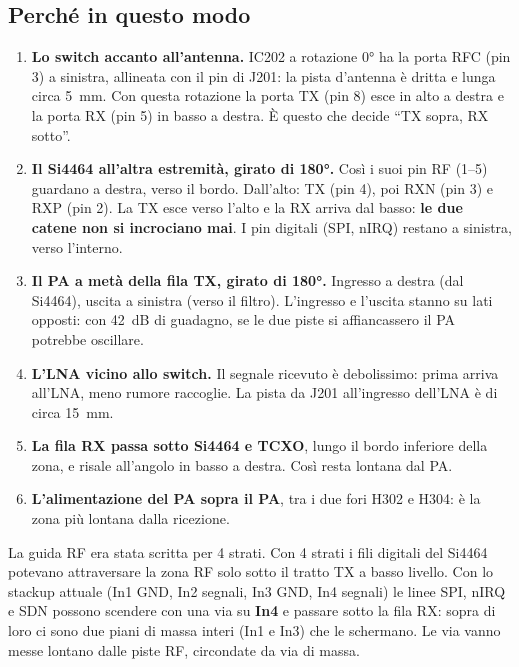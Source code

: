 \documentclass[a4paper,11pt]{article}
\begin{document}
\subsection{Perché in questo modo}
\begin{enumerate}
\item \textbf{Lo switch accanto all'antenna.} IC202 a rotazione \ang{0} ha la porta RFC (pin 3) a sinistra, allineata con il pin di J201: la pista d'antenna è dritta e lunga circa \SI{5}{mm}. Con questa rotazione la porta TX (pin 8) esce in alto a destra e la porta RX (pin 5) in basso a destra. È questo che decide \enquote{TX sopra, RX sotto}.
\item \textbf{Il Si4464 all'altra estremità, girato di \ang{180}.} Così i suoi pin RF (1--5) guardano a destra, verso il bordo. Dall'alto: TX (pin 4), poi RXN (pin 3) e RXP (pin 2). La TX esce verso l'alto e la RX arriva dal basso: \textbf{le due catene non si incrociano mai}. I pin digitali (SPI, nIRQ) restano a sinistra, verso l'interno.
\item \textbf{Il PA a metà della fila TX, girato di \ang{180}.} Ingresso a destra (dal Si4464), uscita a sinistra (verso il filtro). L'ingresso e l'uscita stanno su lati opposti: con \SI{42}{dB} di guadagno, se le due piste si affiancassero il PA potrebbe oscillare.
\item \textbf{L'LNA vicino allo switch.} Il segnale ricevuto è debolissimo: prima arriva all'LNA, meno rumore raccoglie. La pista da J201 all'ingresso dell'LNA è di circa \SI{15}{mm}.
\item \textbf{La fila RX passa sotto Si4464 e TCXO}, lungo il bordo inferiore della zona, e risale all'angolo in basso a destra. Così resta lontana dal PA.
\item \textbf{L'alimentazione del PA sopra il PA}, tra i due fori H302 e H304: è la zona più lontana dalla ricezione.
\end{enumerate}

\begin{nota}
La guida RF era stata scritta per 4 strati. Con 4 strati i fili digitali del Si4464 potevano attraversare la zona RF solo sotto il tratto TX a basso livello. Con lo stackup attuale (In1 GND, In2 segnali, In3 GND, In4 segnali) le linee SPI, nIRQ e SDN possono scendere con una via su \textbf{In4} e passare sotto la fila RX: sopra di loro ci sono due piani di massa interi (In1 e In3) che le schermano. Le via vanno messe lontano dalle piste RF, circondate da via di massa.
\end{nota}
\end{document}
